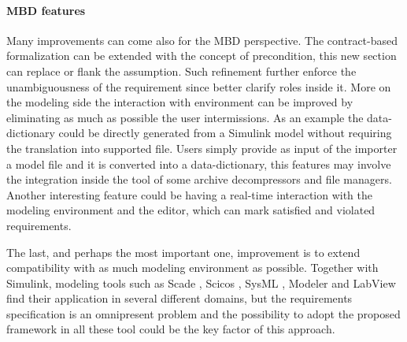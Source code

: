 \paragraph{MBD features} Many improvements can come also for the MBD perspective. The contract-based formalization can be extended with the concept of precondition, this new section can replace or flank the assumption. Such refinement further enforce the unambiguousness of the requirement since better clarify roles inside it. More on the modeling side the interaction with environment can be improved by eliminating as much as possible the user intermissions. As an example the data-dictionary could be directly generated from a Simulink model without requiring the translation into supported file. Users simply provide as input of the importer a model file and it is converted into a data-dictionary, this features may involve the integration inside the tool of some archive decompressors and file managers. Another interesting feature could be having a real-time interaction with the modeling environment and the editor, which can mark satisfied and violated requirements.
\par The last, and perhaps the most important one, improvement is to extend compatibility with as much modeling environment as possible. Together with Simulink, modeling tools such as Scade \citep{Scade}, Scicos \citep{Scicos}, SysML \citep{sysml}, Modeler\citep{Modeler} and LabView \citep{Labview} find their application in several different domains, but the requirements specification is an omnipresent problem and the possibility to adopt the proposed framework in all these tool could be the key factor of this approach.